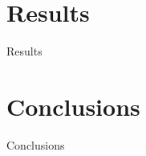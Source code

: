 \documentclass[11pt]{beamer}
\begin{document}
\section{Results}
\begin{frame}{Results}

\end{frame}

\section{Conclusions}
\begin{frame}{Conclusions}

\end{frame}
\end{document}
